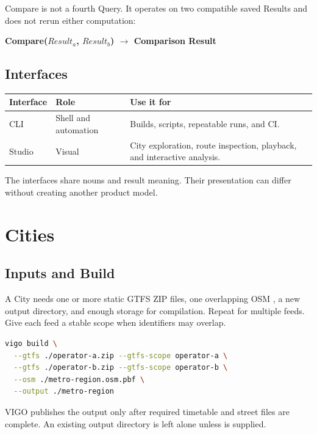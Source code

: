 \documentclass[10pt,letterpaper]{article}
\begin{document}
Compare is not a fourth Query. It operates on two compatible saved Results and does not rerun either computation:

\begin{center}
\sffamily\bfseries\color{VigoNavy}Compare($Result_a$, $Result_b$) $\longrightarrow$ Comparison Result
\end{center}

\subsection{Interfaces}

\begin{center}
\begin{tabularx}{\linewidth}{P{1.0in} P{2.0in} Y}
\toprule
\textbf{Interface} & \textbf{Role} & \textbf{Use it for} \\
\midrule
CLI & Shell and automation & Builds, scripts, repeatable runs, and CI. \\
Studio & Visual & City exploration, route inspection, playback, and interactive analysis. \\
\bottomrule
\end{tabularx}
\end{center}

The interfaces share nouns and result meaning. Their presentation can differ without creating another product model.

\section{Cities}

\subsection{Inputs and Build}

A City needs one or more static GTFS ZIP files, one overlapping OSM , a new output directory, and enough storage for compilation. Repeat  for multiple feeds. Give each feed a stable scope when identifiers may overlap.

\begin{lstlisting}[language=bash]
vigo build \
  --gtfs ./operator-a.zip --gtfs-scope operator-a \
  --gtfs ./operator-b.zip --gtfs-scope operator-b \
  --osm ./metro-region.osm.pbf \
  --output ./metro-region
\end{lstlisting}

VIGO publishes the output only after required timetable and street files are complete. An existing output directory is left alone unless  is supplied.
\end{document}
